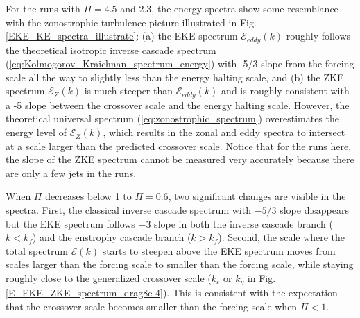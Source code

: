 \documentclass{jfm}
\begin{document}
For the runs with $\Pi=4.5$ and 2.3, the energy spectra show some
resemblance with the zonostrophic turbulence picture illustrated in 
Fig. \ref{EKE_KE_spectra_illustrate}: (a) the EKE spectrum $\mathcal{E}_{eddy}(k)$ 
roughly follows the theoretical isotropic inverse cascade spectrum 
(\ref{eq:Kolmogorov_Kraichnan_spectrum_energy}) with -5/3 slope
from the forcing scale all the way to slightly less than the energy
halting scale, and (b) the ZKE spectrum $\mathcal{E}_{Z}(k)$
is much steeper than $\mathcal{E}_{eddy}(k)$ and is roughly consistent with a -5 slope
between the crossover scale and the energy halting scale. However, the theoretical
universal spectrum (\ref{eq:zonostrophic_spectrum}) overestimates 
the energy level of $\mathcal{E}_{Z}(k)$, which results in the zonal
and eddy spectra to intersect at a scale larger than the predicted
crossover scale. Notice that for the runs here, the slope of the ZKE spectrum
cannot be measured very accurately because there are only a few 
jets in the runs.

When $\Pi$ decreases below 1 to $\Pi=0.6$, two significant changes are 
visible in the spectra. First, the classical inverse cascade spectrum 
with $-5/3$ slope disappears but the EKE spectrum follows $-3$ slope 
in both the inverse cascade branch ($k<k_{f}$) and the  enstrophy cascade branch ($k>k_{f}$). Second, the scale where the total spectrum $\mathcal{E}(k)$ starts to
steepen above the EKE spectrum moves from scales larger than the forcing scale to
smaller than the forcing scale, while staying roughly close to the generalized
crossover scale ($k_\varepsilon$ or $k_\eta$ in Fig. \ref{E_EKE_ZKE_spectrum_drag8e-4}).
This is consistent with the expectation that the crossover scale 
becomes smaller than the forcing scale when $\Pi<1$. 
\end{document}
